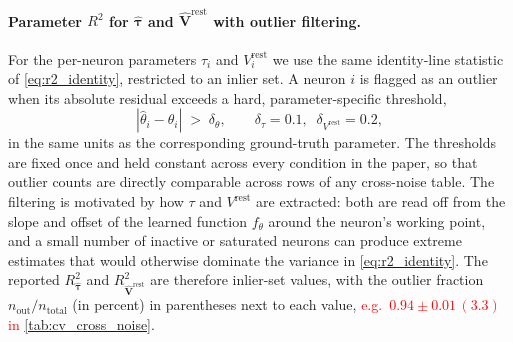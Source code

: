 \documentclass{article}
\def\vrest{V^{\mathrm{rest}}}
\begin{document}
\paragraph{Parameter $R^2$ for $\hat{\boldsymbol{\tau}}$ and
$\hat{\mathbf{V}}^{\mathrm{rest}}$ with outlier filtering.}
For the per-neuron parameters $\tau_i$ and $\vrest_i$ we use the same
identity-line statistic of \cref{eq:r2_identity}, restricted to an
inlier set. A neuron $i$ is flagged as an outlier when its absolute
residual exceeds a hard, parameter-specific threshold,
\begin{equation}
    |\hat\theta_i - \theta_i| \;>\; \delta_\theta,
    \qquad
    \delta_\tau = 0.1,\;\;
    \delta_{\vrest} = 0.2,
    \label{eq:outlier_threshold}
\end{equation}
in the same units as the corresponding ground-truth parameter. The
thresholds are fixed once and held constant across every condition in
the paper, so that outlier counts are directly comparable across rows
of any cross-noise table. The filtering is motivated by
how $\tau$ and $\vrest$ are extracted: both are read off from the
slope and offset of the learned function
$f_\theta$ around the neuron's working point, and a small number of
inactive or saturated neurons can produce extreme estimates that
would otherwise dominate the variance in
\cref{eq:r2_identity}. The reported $R^2_{\hat{\boldsymbol{\tau}}}$
and $R^2_{\hat{\mathbf{V}}^{\mathrm{rest}}}$ are therefore
inlier-set values, with the outlier fraction
$n_{\text{out}}/n_{\text{total}}$ (in percent) in parentheses next to
each value, \textcolor{red}{e.g.\ $0.94 \pm 0.01\,(3.3)$ in}
\cref{tab:cv_cross_noise}.
\end{document}
